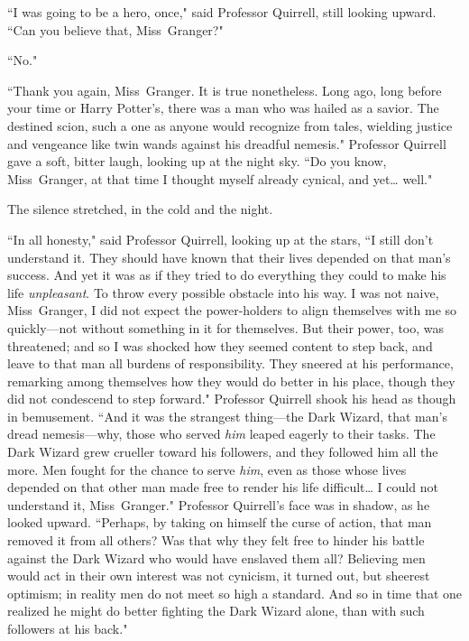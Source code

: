 ``I was going to be a hero, once," said Professor Quirrell, still looking upward. ``Can you believe that, Miss~Granger?"

``No."

``Thank you again, Miss~Granger. It is true nonetheless. Long ago, long before your time or Harry Potter's, there was a man who was hailed as a savior. The destined scion, such a one as anyone would recognize from tales, wielding justice and vengeance like twin wands against his dreadful nemesis." Professor Quirrell gave a soft, bitter laugh, looking up at the night sky. ``Do you know, Miss~Granger, at that time I thought myself already cynical, and yet{\ldots} well."

The silence stretched, in the cold and the night.

``In all honesty," said Professor Quirrell, looking up at the stars, ``I still don't understand it. They should have known that their lives depended on that man's success. And yet it was as if they tried to do everything they could to make his life \emph{unpleasant}. To throw every possible obstacle into his way. I was not naive, Miss~Granger, I did not expect the power-holders to align themselves with me so quickly—not without something in it for themselves. But their power, too, was threatened; and so I was shocked how they seemed content to step back, and leave to that man all burdens of responsibility. They sneered at his performance, remarking among themselves how they would do better in his place, though they did not condescend to step forward." Professor Quirrell shook his head as though in bemusement. ``And it was the strangest thing—the Dark Wizard, that man's dread nemesis—why, those who served \emph{him} leaped eagerly to their tasks. The Dark Wizard grew crueller toward his followers, and they followed him all the more. Men fought for the chance to serve \emph{him}, even as those whose lives depended on that other man made free to render his life difficult{\ldots} I could not understand it, Miss~Granger." Professor Quirrell's face was in shadow, as he looked upward. ``Perhaps, by taking on himself the curse of action, that man removed it from all others? Was that why they felt free to hinder his battle against the Dark Wizard who would have enslaved them all? Believing men would act in their own interest was not cynicism, it turned out, but sheerest optimism; in reality men do not meet so high a standard. And so in time that one realized he might do better fighting the Dark Wizard alone, than with such followers at his back."

